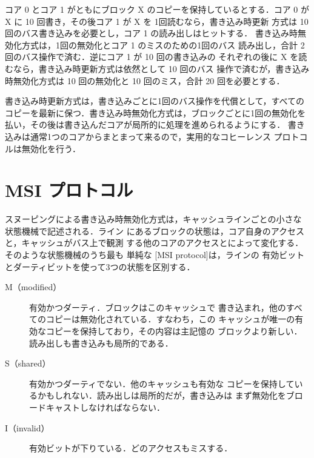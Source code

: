 \documentclass[../main.tex]{subfiles}
\begin{document}
\begin{example}
  コア 0 とコア 1 がともにブロック X のコピーを保持しているとする．コア 0
  が X に 10 回書き，その後コア 1 が X を 1回読むなら，書き込み時更新
  方式は 10 回のバス書き込みを必要とし，コア 1 の読み出しはヒットする．
  書き込み時無効化方式は，1回の無効化とコア 1 のミスのための1回のバス
  読み出し，合計 2回のバス操作で済む．逆にコア 1 が 10 回の書き込みの
  それぞれの後に X を読むなら，書き込み時更新方式は依然として 10 回のバス
  操作で済むが，書き込み時無効化方式は 10 回の無効化と 10 回のミス，合計
  20 回を必要とする．
\end{example}

\begin{keypoint}
  書き込み時更新方式は，書き込みごとに1回のバス操作を代償として，すべての
  コピーを最新に保つ．書き込み時無効化方式は，ブロックごとに1回の無効化を
  払い，その後は書き込んだコアが局所的に処理を進められるようにする．
  書き込みは通常1つのコアからまとまって来るので，実用的なコヒーレンス
  プロトコルは無効化を行う．
\end{keypoint}

\section{MSI プロトコル}
\label{sec:l19-msi}

スヌーピングによる書き込み時無効化方式は，キャッシュラインごとの小さな
状態機械で記述される．ライン
にあるブロックの状態は，コア自身のアクセスと，キャッシュがバス上で観測
する他のコアのアクセスとによって変化する．そのような状態機械のうち最も
単純な [MSI protocol]は，ラインの
有効ビットとダーティビットを使って3つの状態を区別する．
\begin{description}
  \item[M（modified）] 有効かつダーティ．ブロックはこのキャッシュで
    書き込まれ，他のすべてのコピーは無効化されている．すなわち，この
    キャッシュが唯一の有効なコピーを保持しており，その内容は主記憶の
    ブロックより新しい．読み出しも書き込みも局所的である．
  \item[S（shared）] 有効かつダーティでない．他のキャッシュも有効な
    コピーを保持しているかもしれない．読み出しは局所的だが，書き込みは
    まず無効化をブロードキャストしなければならない．
  \item[I（invalid）] 有効ビットが下りている．どのアクセスもミスする．
\end{description}
\end{document}
